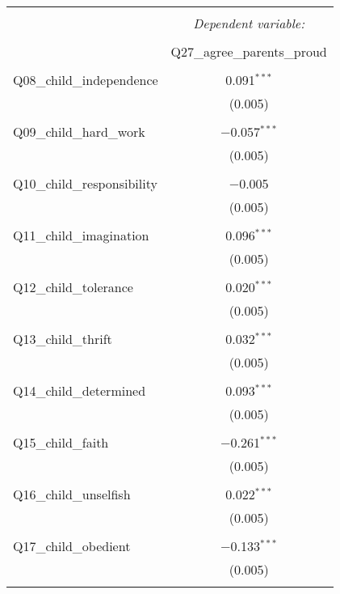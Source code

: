 
\begin{table}[!htbp] \centering 
  \caption{} 
  \label{} 
\begin{tabular}{@{\extracolsep{5pt}}lc} 
\\[-1.8ex]\hline 
\hline \\[-1.8ex] 
 & \multicolumn{1}{c}{\textit{Dependent variable:}} \\ 
\cline{2-2} 
\\[-1.8ex] & Q27\_agree\_parents\_proud \\ 
\hline \\[-1.8ex] 
 Q08\_child\_independence & 0.091$^{***}$ \\ 
  & (0.005) \\ 
  & \\ 
 Q09\_child\_hard\_work & $-$0.057$^{***}$ \\ 
  & (0.005) \\ 
  & \\ 
 Q10\_child\_responsibility & $-$0.005 \\ 
  & (0.005) \\ 
  & \\ 
 Q11\_child\_imagination & 0.096$^{***}$ \\ 
  & (0.005) \\ 
  & \\ 
 Q12\_child\_tolerance & 0.020$^{***}$ \\ 
  & (0.005) \\ 
  & \\ 
 Q13\_child\_thrift & 0.032$^{***}$ \\ 
  & (0.005) \\ 
  & \\ 
 Q14\_child\_determined & 0.093$^{***}$ \\ 
  & (0.005) \\ 
  & \\ 
 Q15\_child\_faith & $-$0.261$^{***}$ \\ 
  & (0.005) \\ 
  & \\ 
 Q16\_child\_unselfish & 0.022$^{***}$ \\ 
  & (0.005) \\ 
  & \\ 
 Q17\_child\_obedient & $-$0.133$^{***}$ \\ 
  & (0.005) \\ 
  & \\ 

\end{tabular}
\end{table}
